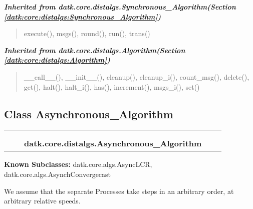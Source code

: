 \large{\textbf{\textit{Inherited from datk.core.distalgs.Synchronous\_Algorithm\textit{(Section \ref{datk:core:distalgs:Synchronous_Algorithm})}}}}

\begin{quote}
execute(), msgs(), round(), run(), trans()
\end{quote}

\large{\textbf{\textit{Inherited from datk.core.distalgs.Algorithm\textit{(Section \ref{datk:core:distalgs:Algorithm})}}}}

\begin{quote}
\_\_call\_\_(), \_\_init\_\_(), cleanup(), cleanup\_i(), count\_msg(), delete(), get(), halt(), halt\_i(), has(), increment(), msgs\_i(), set()
\end{quote}


\subsection{Class Asynchronous\_Algorithm}

    \label{datk:core:distalgs:Asynchronous_Algorithm}
\begin{tabular}{cccccc}
\multicolumn{2}{r}{\settowidth{\BCL}{datk.core.distalgs.Algorithm}\multirow{2}{\BCL}{datk.core.distalgs.Algorithm}}
&&
  \\\cline{3-3}
  &&\multicolumn{1}{c|}{}
&&
  \\
&&\multicolumn{2}{l}{\textbf{datk.core.distalgs.Asynchronous\_Algorithm}}
\end{tabular}

\textbf{Known Subclasses:}
datk.core.algs.AsyncLCR,
    datk.core.algs.AsynchConvergecast

We assume that the separate Processes take steps in an arbitrary order, at 
arbitrary relative speeds.



